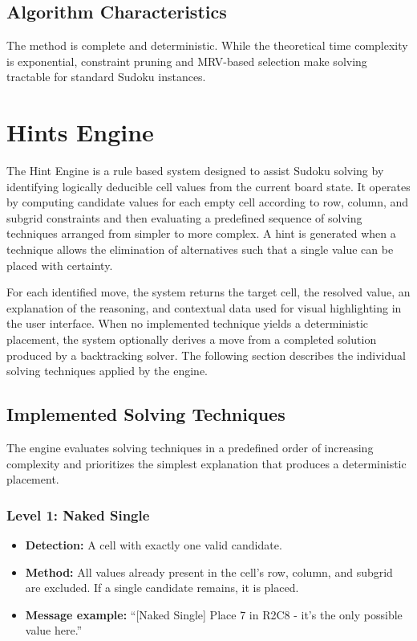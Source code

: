 \documentclass[12pt,a4paper]{article}
\begin{document}
\subsection{Algorithm Characteristics}
The method is complete and deterministic. While the theoretical time complexity is exponential, constraint pruning and MRV-based selection make solving tractable for standard Sudoku instances.

\newpage

\section{Hints Engine}
The Hint Engine is a rule based system designed to assist Sudoku solving by identifying logically deducible cell values from the current board state. It operates by computing candidate values for each empty cell according to row, column, and subgrid constraints and then evaluating a predefined sequence of solving techniques arranged from simpler to more complex. A hint is generated when a technique allows the elimination of alternatives such that a single value can be placed with certainty.

For each identified move, the system returns the target cell, the resolved value, an explanation of the reasoning, and contextual data used for visual highlighting in the user interface. When no implemented technique yields a deterministic placement, the system optionally derives a move from a completed solution produced by a backtracking solver. The following section describes the individual solving techniques applied by the engine.

\subsection{Implemented Solving Techniques}
The engine evaluates solving techniques in a predefined order of increasing complexity and prioritizes the simplest explanation that produces a deterministic placement.

\subsubsection*{Level 1: Naked Single}
\begin{itemize}
    \item \textbf{Detection:} A cell with exactly one valid candidate.
    \item \textbf{Method:} All values already present in the cell’s row, column, and subgrid are excluded. If a single candidate remains, it is placed.
    \item \textbf{Message example:} “[Naked Single] Place 7 in R2C8 - it's the only possible value here.”
\end{itemize}
\end{document}
